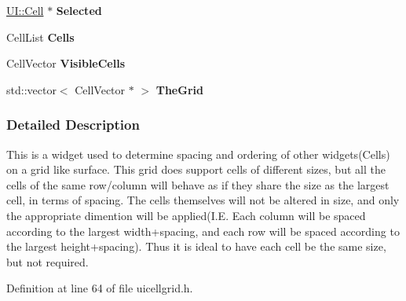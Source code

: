 \begin{DoxyCompactItemize}
\item 
\hypertarget{classphys_1_1UI_1_1CellGrid_ae5864a7174fee981647f339075a11e10}{
\hyperlink{classphys_1_1UI_1_1Cell}{UI::Cell} $\ast$ {\bfseries Selected}}
\label{classphys_1_1UI_1_1CellGrid_ae5864a7174fee981647f339075a11e10}

\item 
\hypertarget{classphys_1_1UI_1_1CellGrid_ac4bb16b8e9fa149d2196362e32a57fdf}{
CellList {\bfseries Cells}}
\label{classphys_1_1UI_1_1CellGrid_ac4bb16b8e9fa149d2196362e32a57fdf}

\item 
\hypertarget{classphys_1_1UI_1_1CellGrid_a7fcb9ac98852926abf686df661acc72d}{
CellVector {\bfseries VisibleCells}}
\label{classphys_1_1UI_1_1CellGrid_a7fcb9ac98852926abf686df661acc72d}

\item 
\hypertarget{classphys_1_1UI_1_1CellGrid_a38f49946396c1d3f1f34edb3e9bf4297}{
std::vector$<$ CellVector $\ast$ $>$ {\bfseries TheGrid}}
\label{classphys_1_1UI_1_1CellGrid_a38f49946396c1d3f1f34edb3e9bf4297}

\end{DoxyCompactItemize}


\subsubsection{Detailed Description}
This is a widget used to determine spacing and ordering of other widgets(Cells) on a grid like surface. This grid does support cells of different sizes, but all the cells of the same row/column will behave as if they share the size as the largest cell, in terms of spacing. The cells themselves will not be altered in size, and only the appropriate dimention will be applied(I.E. Each column will be spaced according to the largest width+spacing, and each row will be spaced according to the largest height+spacing). Thus it is ideal to have each cell be the same size, but not required. 

Definition at line 64 of file uicellgrid.h.



